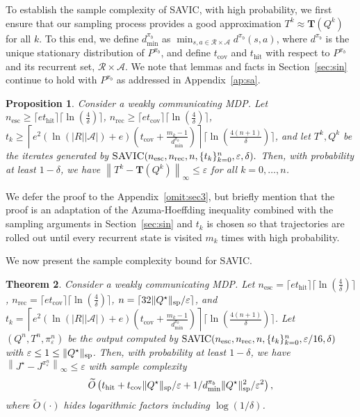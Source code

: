 \documentclass{article}
\newtheorem{theorem}{Theorem}[section]
\newtheorem{proposition}[theorem]{Proposition}
\theoremstyle{definition}
\theoremstyle{remark}
\newcommand{\cA}{\mathcal{A}}
\newcommand{\cR}{\mathcal{R}}
\newcommand{\T}{\mathbf{T}}
\newcommand*{\infn}[1]{\left\|{#1}\right\|_{\infty}}
\renewcommand{\sp}[1]{\|{#1}\|_\text{\rm sp}}
\begin{document}
To establish the sample complexity of SAVIC, with high probability, we first ensure that our sampling process provides a good approximation $T^{k}\approx \T(Q^{k})$ for all $k$.  To this end, we define $d^{\pi_b}_{\mathrm{min}}$ as $\min_{s,a\in \cR\times \cA } d^{\pi_b}(s,a)$, where $d^{\pi_b}$ is the unique stationary distribution of $P^{\pi_b}$, and define $t_{\mathrm{cov}}$ and $ t_{\mathrm{hit}}$ with respect to $P^{\pi_b}$ and its recurrent set, $\cR\times \cA$. We note that lemmas and facts in Section~\ref{sec:sin} continue to hold with $P^{\pi_b}$ as addressed in Appendix~\ref{ap:sa}.  

\begin{proposition}\label{prop:savic}
Consider a weakly communicating MDP. Let $n_{\mathrm{esc}} \ge\lceil e t_{\mathrm{hit}}\rceil \lceil\ln (\frac{4}{\delta})\rceil$, $n_{\mathrm{rec}}  \ge  \lceil  e t_{\mathrm{cov}}\rceil \lceil \ln (\frac{4}{\delta})\rceil$, $
t_k \ge  \left\lceil e^2( \ln(|R||\cA|)+e)\left( t_{\mathrm{cov}}+\frac{m_k-1}{d^{\pi_b}_{\mathrm{min}}}\right)
\right\rceil \lceil \ln(\frac{4(n+1)}{\delta})\rceil$,
and let $T^k, Q^k$ be the iterates generated by $
\mbox{\sc \mbox{SAVIC}}(n_{\mathrm{esc}},n_{\mathrm{rec}},n, \{t_k\}^n_{k=0}, \varepsilon, \delta).$
Then, with probability at least $1-\delta$, we have $
\infn{T^k-\T(Q^k)}\le  \varepsilon $ for all $k=0,\ldots,n$.
\end{proposition}

We defer the proof to the Appendix~\ref{omit:sec3}, but briefly mention that the proof is an adaptation of the Azuma-Hoeffding inequality combined with the sampling arguments in Section~\ref{sec:sin} and $t_k$ is chosen so that trajectories are rolled out until every recurrent state is visited $m_k$ times with high probability.

We now present the sample complexity bound for \mbox{\rm SAVIC}.
\begin{theorem}\label{thm:savic}
Consider a weakly communicating MDP. Let  $
n_{\mathrm{esc}}=\lceil e t_{\mathrm{hit}}\rceil \lceil\ln (\frac{4}{\delta})\rceil$, $n_{\mathrm{rec}} =  \lceil  e t_{\mathrm{cov}}\rceil \lceil \ln (\frac{4}{\delta})\rceil$, $n= \lceil 32\sp{Q^\star}/\varepsilon\rceil$, and $
t_k =  \left\lceil e^2( \ln(|R||\cA|)+e)\left( t_{\mathrm{cov}}+\frac{m_k-1}{d^{\pi_b}_{\mathrm{min}}}\right)
\right\rceil   \lceil \ln(\frac{4(n+1)}{\delta})\rceil $.
Let $(Q^n,T^n,\pi^n_{ \varepsilon})$ be the output computed by $
\sc \mbox{SAVIC}( n_{\mathrm{esc}},n_{\mathrm{rec}}, n, \{t_k\}^n_{k=0}, \varepsilon/16, \delta)$ with $\varepsilon \le 1 \le \sp{Q^\star}$.
Then, with probability at least $1-\delta$, we have $
\infn{J^\star-J^{\pi^n_{ \varepsilon}}} \le \varepsilon$
with sample complexity
\[
\widetilde{O}\left(t_{\mathrm{hit}}+t_{\mathrm{cov}}\sp{Q^\star}/\varepsilon
+ 1/d^{\pi_b}_{\mathrm{min}} \sp{Q^\star}^2/\varepsilon^{2}\right),
\]
where $\widetilde{O}(\cdot)$ hides logarithmic factors including $\log(1/\delta)$.
\end{theorem}
\end{document}

